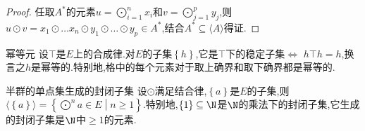 \begin{proof}
	任取$A^{\ast}$的元素$u=\bigodot\limits_{i=1}^{n}x_{i}$和$v=\bigodot\limits_{j=1}^{p}y_{j}$,则$u\odot v=x_{1}\odot\ldots x_{n}\odot y_{1}\odot\ldots\odot y_{p}\in A^{\ast}$,结合$A^{\ast}\subseteq\langle A\rangle$得证.
\end{proof}

\begin{example}{幂等元}{}
	设$\top$是$E$上的合成律.对$E$的子集$\left\{h\right\}$,它是$\top$下的稳定子集$\iff$ $h\top h=h$,换言之$h$是幂等的.特别地,格中的每个元素对于取上确界和取下确界都是幂等的.
\end{example}

\begin{example}{半群的单点集生成的封闭子集}{}
	设$\odot$满足结合律,$\left\{a\right\}$是$E$的子集,则$\langle\left\{a\right\}\rangle=\left\{\bigodot\limits^{n}a\in E\middle|n\geq 1\right\}$.特别地,$\left\{1\right\}\subseteq\N$是$\N$的乘法下的封闭子集,它生成的封闭子集是$\N$中$\geq 1$的元素.
\end{example}